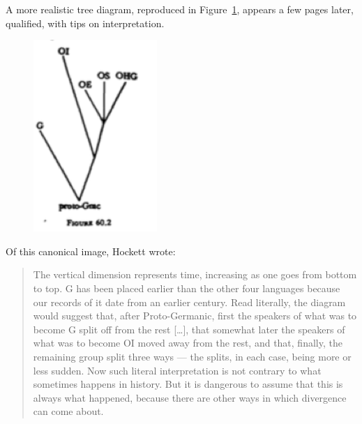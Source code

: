 \documentclass[output=paper]{langscibook}
\begin{document}
A more realistic tree diagram, reproduced in Figure~\ref{fig:kaplan:hockett1959519}, appears a few pages later, qualified, with tips on interpretation.

\begin{figure}
    \centering
    \includegraphics[scale=1]{figures/hockett1958-519.png}
    \caption{\citet[519]{Hockett19591958}}
    \label{fig:kaplan:hockett1959519}
\end{figure}

Of this canonical image, Hockett wrote:

\begin{quotation}
The vertical dimension represents time, increasing as one goes from bottom to top. G has been placed earlier than the other four languages because our records of it date from an earlier century. Read literally, the diagram would suggest that, after Proto-Germanic, first the speakers of what was to become G split off from the rest […], that somewhat later the speakers of what was to become OI moved away from the rest, and that, finally, the remaining group split three ways — the splits, in each case, being more or less sudden. Now such literal interpretation is not contrary to what sometimes happens in history. But it is dangerous to assume that this is always what happened, because there are other ways in which divergence can come about.  \citep[519-521]{Hockett19591958}
\end{quotation}
\end{document}
